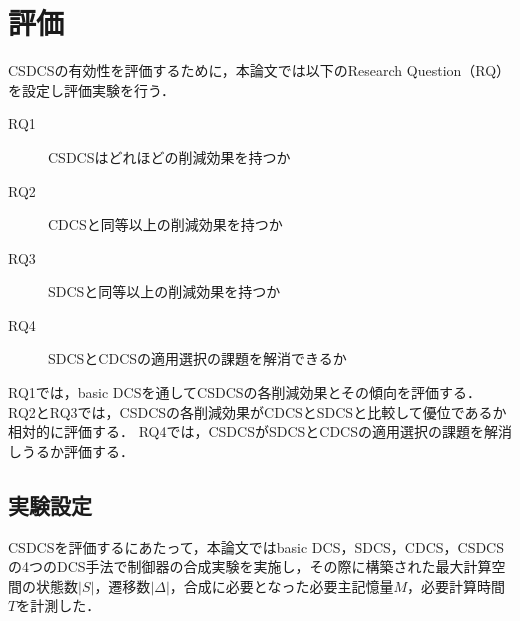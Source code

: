 \section{評価}
\label{section:evaluation}
CSDCSの有効性を評価するために，本論文では以下のResearch Question（RQ）を設定し評価実験を行う．

{
\begin{description}
  \item[RQ1] CSDCSはどれほどの削減効果を持つか
  \item[RQ2] CDCSと同等以上の削減効果を持つか
  \item[RQ3] SDCSと同等以上の削減効果を持つか
  \item[RQ4] SDCSとCDCSの適用選択の課題を解消できるか
\end{description}
}

RQ1では，basic DCSを通してCSDCSの各削減効果とその傾向を評価する．
RQ2とRQ3では，CSDCSの各削減効果がCDCSとSDCSと比較して優位であるか相対的に評価する．
RQ4では，CSDCSがSDCSとCDCSの適用選択の課題を解消しうるか評価する．

\subsection{実験設定}
CSDCSを評価するにあたって，本論文ではbasic DCS，SDCS，CDCS，CSDCSの4つのDCS手法で制御器の合成実験を実施し，その際に構築された最大計算空間の状態数$|S|$，遷移数$|\Delta|$，合成に必要となった必要主記憶量$M$，必要計算時間$T$を計測した．

